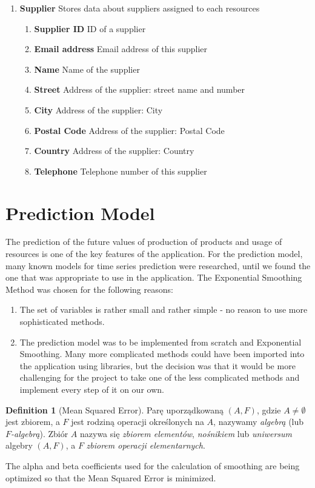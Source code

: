 \documentclass[a4paper,11pt,twoside]{report}
\theoremstyle{definition}
\newtheorem{definition}[theorem]{Definition}
\begin{document}
\begin{enumerate}
\item \textbf{Supplier} Stores data about suppliers assigned to each resources
\begin{enumerate}
\item \textbf{Supplier ID} ID of a supplier
\item \textbf{Email address} Email address of this supplier
\item \textbf{Name} Name of the supplier
\item \textbf{Street} Address of the supplier: street name and number
\item \textbf{City} Address of the supplier: City
\item \textbf{Postal Code} Address of the supplier: Postal Code
\item \textbf{Country} Address of the supplier: Country
\item \textbf{Telephone} Telephone number of this supplier
\end{enumerate}

\end{enumerate}
 
\section{Prediction Model}

The prediction of the future values of production of products and usage of resources is one of the key features of the application.
For the prediction model, many known models for time series prediction were researched, until we found the one that was appropriate to use in the application. The Exponential Smoothing Method was chosen for the following reasons:
\begin{enumerate}
\item The set of variables is rather small and rather simple - no reason to use more sophisticated methods.
\item The prediction model was to be implemented from scratch and Exponential Smoothing. Many more complicated methods could have been imported into the application using libraries, but the decision was that it would be more challenging for the project to take one of the less complicated methods and implement every step of it on our own.
\end{enumerate}

\begin{definition}[Mean Squared Error]
Parę uporządkowaną $(A,F)$, gdzie $A\neq \emptyset$ jest zbiorem, a $F$ jest rodziną operacji określonych na $A$, nazywamy \textit{algebrą} (lub \textit{$F$-algebrą}). Zbiór $A$ nazywa się \textit{zbiorem elementów}, \textit{nośnikiem} lub \textit{uniwersum} algebry $(A,F)$, a $F$ \textit{zbiorem operacji elementarnych}.
\end{definition}
The alpha and beta coefficients used for the calculation of smoothing are being optimized so that the Mean Squared Error is minimized.
\end{document}

